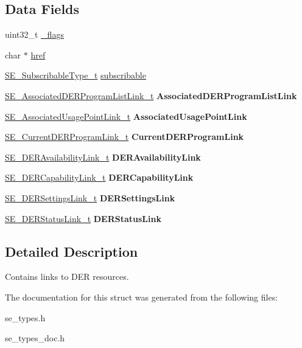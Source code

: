 \subsection*{Data Fields}
\begin{DoxyCompactItemize}
\item 
uint32\+\_\+t \hyperlink{group__DER_ga14d4c11d981ae1285bb33f33c82a59a7}{\+\_\+flags}
\item 
char $\ast$ \hyperlink{group__DER_ga10244717c814d6a385718a1e02241844}{href}
\item 
\hyperlink{group__SubscribableType_ga5c41f553d369710ed34619266bf2551e}{S\+E\+\_\+\+Subscribable\+Type\+\_\+t} \hyperlink{group__DER_gae628e1aac2a06a2eaece5c863d79ce73}{subscribable}
\item 
\hyperlink{structSE__AssociatedDERProgramListLink__t}{S\+E\+\_\+\+Associated\+D\+E\+R\+Program\+List\+Link\+\_\+t} {\bfseries Associated\+D\+E\+R\+Program\+List\+Link}
\item 
\hyperlink{structSE__AssociatedUsagePointLink__t}{S\+E\+\_\+\+Associated\+Usage\+Point\+Link\+\_\+t} {\bfseries Associated\+Usage\+Point\+Link}
\item 
\hyperlink{structSE__CurrentDERProgramLink__t}{S\+E\+\_\+\+Current\+D\+E\+R\+Program\+Link\+\_\+t} {\bfseries Current\+D\+E\+R\+Program\+Link}
\item 
\hyperlink{structSE__DERAvailabilityLink__t}{S\+E\+\_\+\+D\+E\+R\+Availability\+Link\+\_\+t} {\bfseries D\+E\+R\+Availability\+Link}
\item 
\hyperlink{structSE__DERCapabilityLink__t}{S\+E\+\_\+\+D\+E\+R\+Capability\+Link\+\_\+t} {\bfseries D\+E\+R\+Capability\+Link}
\item 
\hyperlink{structSE__DERSettingsLink__t}{S\+E\+\_\+\+D\+E\+R\+Settings\+Link\+\_\+t} {\bfseries D\+E\+R\+Settings\+Link}
\item 
\hyperlink{structSE__DERStatusLink__t}{S\+E\+\_\+\+D\+E\+R\+Status\+Link\+\_\+t} {\bfseries D\+E\+R\+Status\+Link}
\end{DoxyCompactItemize}


\subsection{Detailed Description}
Contains links to D\+ER resources. 

The documentation for this struct was generated from the following files\+:\begin{DoxyCompactItemize}
\item 
se\+\_\+types.\+h\item 
se\+\_\+types\+\_\+doc.\+h\end{DoxyCompactItemize}
